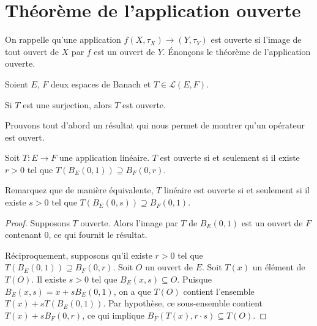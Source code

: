 \section{Théorème de l'application ouverte}
On rappelle qu'une application $f(X, \tau_X)\to(Y, \tau_Y)$ est ouverte
si l'image de tout ouvert de $X$ par $f$ est un ouvert de $Y$.
\'{E}nonçons le théorème de l'application ouverte.

\begin{thm}
  Soient $E$, $F$ deux espaces de Banach et $T\in\mathscr{L}(E, F)$.

  Si $T$ est une surjection, alors $T$ est ouverte.
\end{thm}

Prouvons tout d'abord un résultat qui nous permet de montrer
qu'un opérateur est ouvert.
\begin{prop}
  Soit $T: E\to F$ une application linéaire. $T$ est ouverte si et seulement
  si il existe $r>0$ tel que $T\left(B_E(0, 1)\right)\supseteq B_F(0, r)$.
\end{prop}

Remarquez que de manière équivalente, $T$ linéaire est ouverte si et seulement
si il existe $s>0$ tel que $T\left(B_E(0, s)\right)\supseteq B_F(0, 1)$.

\begin{proof}
  Supposons $T$ ouverte. Alors l'image par $T$ de $B_E(0, 1)$ est un ouvert
  de $F$ contenant $0$, ce qui fournit le résultat.

  Réciproquement, supposons qu'il existe $r>0$ tel que
  $T\left(B_E(0, 1)\right)\supseteq B_F(0, r)$. Soit $O$ un ouvert de $E$.
  Soit $T(x)$ un élément de $T(O)$. Il existe $s>0$ tel que $B_E(x, s)%
  \subseteq O$. Puisque $B_E(x, s) = x + s B_E(0, 1)$, on a que $T(O)$ contient
  l'ensemble $T(x) + s T(B_E(0, 1))$.
  Par hypothèse, ce sous-ensemble contient $T(x) + s B_F(0, r)$, ce qui
  implique $B_F(T(x), r\cdot{}s)\subseteq T(O)$.
\end{proof}

